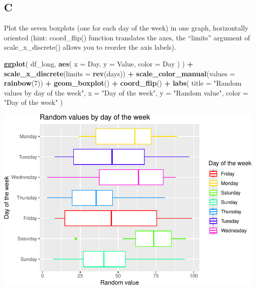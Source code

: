 \documentclass[
]{article}
\newenvironment{Shaded}{\begin{snugshade}}{\end{snugshade}}
\newcommand{\AttributeTok}[1]{\textcolor[rgb]{0.13,0.29,0.53}{#1}}
\newcommand{\DecValTok}[1]{\textcolor[rgb]{0.00,0.00,0.81}{#1}}
\newcommand{\FunctionTok}[1]{\textcolor[rgb]{0.13,0.29,0.53}{\textbf{#1}}}
\newcommand{\NormalTok}[1]{#1}
\newcommand{\SpecialCharTok}[1]{\textcolor[rgb]{0.81,0.36,0.00}{\textbf{#1}}}
\newcommand{\StringTok}[1]{\textcolor[rgb]{0.31,0.60,0.02}{#1}}
\begin{document}
\hypertarget{c-3}{%
\subsection{C}\label{c-3}}

Plot the seven boxplots (one for each day of the week) in one graph,
horizontally oriented (hint: coord\_flip() function translates the axes,
the ``limits'' argument of scale\_x\_discrete() allows you to reorder
the axis labels).

\begin{Shaded}
\begin{Highlighting}[]
\FunctionTok{ggplot}\NormalTok{(}
\NormalTok{  df\_long,}
  \FunctionTok{aes}\NormalTok{(}
    \AttributeTok{x =}\NormalTok{ Day,}
    \AttributeTok{y =}\NormalTok{ Value,}
    \AttributeTok{color =}\NormalTok{ Day}
\NormalTok{  )}
\NormalTok{) }\SpecialCharTok{+}
  \FunctionTok{scale\_x\_discrete}\NormalTok{(}\AttributeTok{limits =} \FunctionTok{rev}\NormalTok{(days)) }\SpecialCharTok{+}
  \FunctionTok{scale\_color\_manual}\NormalTok{(}\AttributeTok{values =} \FunctionTok{rainbow}\NormalTok{(}\DecValTok{7}\NormalTok{)) }\SpecialCharTok{+}
  \FunctionTok{geom\_boxplot}\NormalTok{() }\SpecialCharTok{+}
  \FunctionTok{coord\_flip}\NormalTok{() }\SpecialCharTok{+}
  \FunctionTok{labs}\NormalTok{(}
    \AttributeTok{title =} \StringTok{"Random values by day of the week"}\NormalTok{,}
    \AttributeTok{x =} \StringTok{"Day of the week"}\NormalTok{,}
    \AttributeTok{y =} \StringTok{"Random value"}\NormalTok{,}
    \AttributeTok{color =} \StringTok{"Day of the week"}
\NormalTok{  )}
\end{Highlighting}
\end{Shaded}

\includegraphics{es_files/figure-latex/unnamed-chunk-16-1.pdf}
\end{document}
